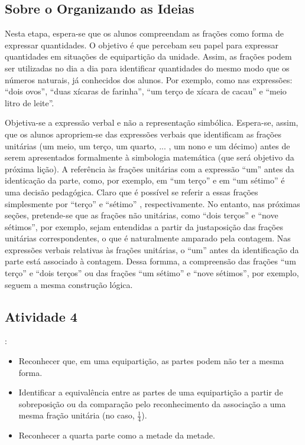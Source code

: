 \begin{multicols}{2}
\subsection{Sobre o Organizando as Ideias}

  Nesta etapa, espera-se que os alunos compreendam as frações como forma de expressar quantidades. O objetivo é que percebam seu papel para expressar quantidades em situações de equipartição da unidade. Assim, as frações podem ser utilizadas no dia a dia para identificar quantidades do mesmo modo que os números naturais, já conhecidos dos alunos. Por exemplo, como nas expressões:   ``dois ovos'',   ``duas xícaras de farinha'',   ``um terço de xícara de cacau''   e   ``meio litro de leite''.

  Objetiva-se a expressão verbal e não a representação simbólica. Espera-se, assim, que os alunos apropriem-se das expressões verbais que identificam as frações unitárias (um meio, um terço, um quarto, ... , um nono e um décimo) antes de serem apresentados formalmente à simbologia matemática (que será objetivo da próxima lição).  A referência às frações unitárias com a expressão   ``um''   antes da identicação da parte, como, por exemplo, em   ``um terço''   e em   ``um sétimo''   é uma decisão pedagógica. Claro que é possível se referir a essas frações simplesmente por   ``terço''   e   ``sétimo''  , respectivamente. No entanto, nas próximas seções, pretende-se que as frações não unitárias, como   ``dois terços''   e   ``nove sétimos'', por exemplo, sejam entendidas a partir da justaposição das frações unitárias correspondentes, o que é naturalmente amparado pela contagem. Nas expressões verbais relativas às frações unitárias, o   ``um''   antes da identificação da parte está associado à contagem. Dessa formma, a compreensão das frações   ``um terço''   e   ``dois terços''   ou das frações ``um sétimo'' e ``nove sétimos'', por exemplo, seguem a mesma construção lógica.

\Bg
\Bg
  
\subsection{Atividade 4}
  \vspace{.1cm}:
\begin{itemize} %
    \item       Reconhecer que, em uma equipartição, as partes podem não ter a mesma forma.
    \item       Identificar a equivalência entre as partes de uma equipartição a partir de sobreposição ou da comparação pelo reconhecimento da associação a uma mesma fração unitária (no caso, $\frac{1}{4}$).
    \item       Reconhecer a quarta parte como a metade da metade.
\end{itemize} %
 \vspace{.1cm}
 

\end{multicols}
